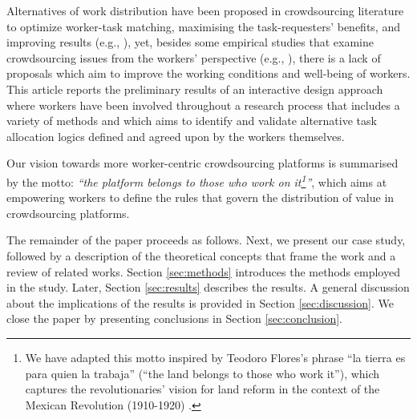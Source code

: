 Alternatives of work distribution have been proposed in crowdsourcing literature to optimize worker-task matching, maximising the task-requesters' benefits, and improving results (e.g., \cite{difallah2013pick, ho2012online, karger2014budget, yin2017task}), yet, besides some empirical studies that examine crowdsourcing issues from the workers' perspective (e.g., \cite{mcinnis2016taking, brawley2016work, faullant2013fair}), there is a lack of proposals which aim to improve the working conditions and well-being of workers. This article reports the preliminary results of an interactive design approach where workers have been involved throughout a research process that includes a variety of methods and which aims to identify and validate alternative task allocation logics defined and agreed upon by the workers themselves.

Our vision towards more worker-centric crowdsourcing platforms is summarised by the motto: \textit{``the platform belongs to those who work on it\footnote{We have adapted this motto inspired by Teodoro Flores's phrase ``la tierra es para quien la trabaja'' (``the land belongs to those who work it''), which captures the revolutionaries' vision for land reform in the context of the Mexican Revolution (1910-1920) \cite{mcneely1966origins}.}''}, which aims at empowering workers to define the rules that govern the distribution of value in crowdsourcing platforms.

The remainder of the paper proceeds as follows. Next, we present our case study, followed by a description of the theoretical concepts that frame the work and a review of related works. Section \ref{sec:methods} introduces the methods employed in the study. Later, Section \ref{sec:results} describes the results. A general discussion about the implications of the results is provided in Section \ref{sec:discussion}. We close the paper by presenting conclusions in Section \ref{sec:conclusion}.